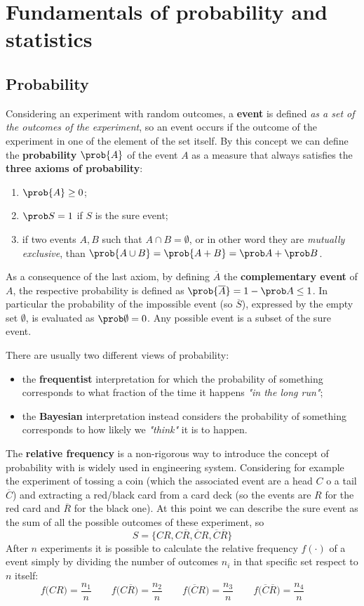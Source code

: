 \chapter{Fundamentals of probability and statistics} \label{sec:probabilityresume}
\section*{Probability}
	Considering an experiment with random outcomes, a \textbf{event} is defined \textit{as a set of the outcomes of the experiment}, so an event occurs if the outcome of the experiment in one of the element of the set itself. By this concept we can define the \textbf{probability} $\prob{A}$ of the event $A$ as a measure that always satisfies the \textbf{three axioms of probability}:
	\begin{enumerate}
		\item $\prob{A} \geq 0$;
		\item $\prob S = 1$  if $S$ is the sure event;
		\item if two events $A,B$ such that $A \cap B = \emptyset$, or in other word they are \textit{mutually exclusive}, than $\prob{A \cup B} = \prob{A+B} = \prob A + \prob B$.
	\end{enumerate} 

	As a consequence of the last axiom, by defining $\overline A$ the \textbf{complementary event} of $A$, the respective probability is defined as $\prob{\overline A} = 1 - \prob A \leq 1$. In particular the probability of the impossible event (so $\overline S$), expressed by the empty set $\emptyset$, is evaluated as $\prob\emptyset = 0$. Any possible event is a subset of the sure event.
	
	There are usually two different views of probability:
	\begin{itemize}
		\item the \textbf{frequentist} interpretation for which the probability of something corresponds to what fraction of the time it happens \textit{"in the long run"};
		\item the \textbf{Bayesian} interpretation instead considers the probability of something corresponds to how likely we \textit{"think"} it is to happen.
	\end{itemize}
	The \textbf{relative frequency} is a non-rigorous way to introduce the concept of probability with is widely used in engineering system. Considering for example the experiment of tossing a coin (which the associated event are a head $C$ o a tail $\overline C$) and extracting a red/black card from a card deck (so the events are $R$ for the red card and $\overline R$ for the black one). At this point we can describe the sure event as the sum of all the possible outcomes of these experiment, so
	\[ S = \big\{ CR, C\overline R, \overline C R, \overline C \overline R \big\}\]
	After $n$ experiments it is possible to calculate the relative frequency $f(\cdot)$ of a event simply by dividing the number of outcomes $n_i$ in that specific set respect to $n$ itself:
	\[ f\big( CR \big) = \frac{n_1}{n} \qquad f\big( C \overline R \big) = \frac{n_2}{n} \qquad f\big( \overline CR \big) = \frac{n_3}{n} \qquad f\big( \overline C \overline R \big) = \frac{n_4}{n} \qquad  \] 
	
